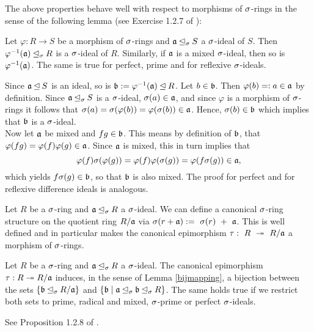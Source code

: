 The above properties behave well with respect to morphisms of $\sigma$-rings in the sense of the following lemma (see Exercise 1.2.7 of \cite{wibmer}):
\begin{lem}\label{bijmapping}
Let $\varphi: R \rightarrow S$ be a morphism of $\sigma$-rings and $\mathfrak{a} \unlhd_{\sigma} S$ a $\sigma$-ideal of $S$. Then $\varphi^{-1}(\mathfrak{a}) \unlhd_{\sigma} R$ is a $\sigma$-ideal of $R$. Similarly, if $\mathfrak{a}$ is a mixed $\sigma$-ideal, then so is $\varphi^{-1}(\mathfrak{a})$. The same is true for perfect, prime and for reflexive $\sigma$-ideals.
\begin{bew}
Since $\mathfrak{a} \unlhd S$ is an ideal, so is $\mathfrak{b} := \varphi^{-1}(\mathfrak{a}) \unlhd R$. Let $b \in \mathfrak{b}$. Then $\varphi(b) =: a \in \mathfrak{a}$ by definition. Since $\mathfrak{a} \unlhd_{\sigma} S$ is a $\sigma$-ideal, $\sigma(a) \in \mathfrak{a}$, and since $\varphi$ is a morphism of $\sigma$-rings
it follows that $\sigma(a) = \sigma(\varphi(b)) = \varphi (\sigma (b)) \in \mathfrak{a}$. Hence, $\sigma(b) \in \mathfrak{b}$ which implies that $\mathfrak{b}$ is a $\sigma$-ideal. \\
\indent Now let $\mathfrak{a}$ be mixed and $fg \in \mathfrak{b}$. This means by definition of $\mathfrak{b}$, 
that $\varphi(fg) = \varphi(f) \varphi(g) \in \mathfrak{a}$. Since $\mathfrak{a}$ is mixed, this in turn implies that $$\varphi(f) \sigma( \varphi(g)) = \varphi(f) \varphi(\sigma(g)) = \varphi(f\sigma(g)) \in \mathfrak{a},$$ which yields $f\sigma(g) \in \mathfrak{b}$, so that $\mathfrak{b}$ is also mixed. 
The proof for perfect and for reflexive difference ideals is analogous.
\end{bew}
\end{lem}

\begin{rem}
Let $R$ be a $\sigma$-ring and $\mathfrak{a} \unlhd_{\sigma} R$ a $\sigma$-ideal. We can define a canonical $\sigma$-ring structure on the quotient ring $R/\mathfrak{a}$ via $\sigma(r+\mathfrak{a}):=~\sigma(r)~+~\mathfrak{a}$. 
This is well defined and in particular makes the canonical epimorphism $\tau:~R~\twoheadrightarrow~R/\mathfrak{a}$ a morphism of $\sigma$-rings.
\end{rem}

\begin{prop}\label{bijideals}
Let $R$ be a $\sigma$-ring and $\mathfrak{a} \unlhd_{\sigma} R$ a $\sigma$-ideal. The canonical epimorphism $\tau: R \twoheadrightarrow R/\mathfrak{a}$ induces, in the sense of Lemma \ref{bijmapping}, a bijection between the sets $\{ \mathfrak{b} \unlhd_{\sigma} R/\mathfrak{a} \}$ and $\{ \mathfrak{b} \mid \mathfrak{a} \unlhd_{\sigma} \mathfrak{b} \unlhd_{\sigma} R \}$. The same holds true if we restrict both sets to prime, radical and mixed, $\sigma$-prime or perfect $\sigma$-ideals.
\begin{bew}
See Proposition 1.2.8 of \cite{wibmer}.
\end{bew}
\end{prop}

